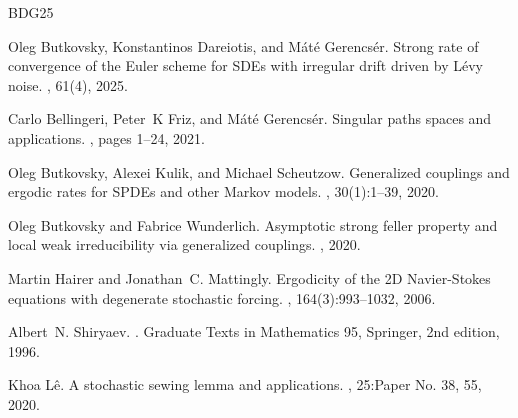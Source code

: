 \documentclass[12pt]{article}
\theoremstyle{definition}
\DeclareMathOperator{\1}{\mathbbm{1}}%
\begin{document}
\begin{thebibliography}{BDG25}

Oleg Butkovsky, Konstantinos Dareiotis, and M\'at\'e Gerencs\'er.
\newblock Strong rate of convergence of the {E}uler scheme for {SDE}s with
  irregular drift driven by {L}\'evy noise.
, 61(4), 2025.

Carlo Bellingeri, Peter~K Friz, and M{\'a}t{\'e} Gerencs{\'e}r.
\newblock Singular paths spaces and applications.
, pages 1--24, 2021.

Oleg Butkovsky, Alexei Kulik, and Michael Scheutzow.
\newblock Generalized couplings and ergodic rates for {SPDE}s and other
  {M}arkov models.
, 30(1):1--39, 2020.

Oleg Butkovsky and Fabrice Wunderlich.
\newblock Asymptotic strong feller property and local weak irreducibility via
  generalized couplings.
, 2020.

Martin Hairer and Jonathan~C. Mattingly.
\newblock Ergodicity of the 2{D} {N}avier-{S}tokes equations with degenerate
  stochastic forcing.
, 164(3):993--1032, 2006.

Albert~N. Shiryaev.
.
\newblock Graduate Texts in Mathematics 95, Springer, 2nd edition, 1996.

Khoa L{\^e}.
\newblock A stochastic sewing lemma and applications.
, 25:Paper No. 38, 55, 2020.

\end{thebibliography}
\end{document}
